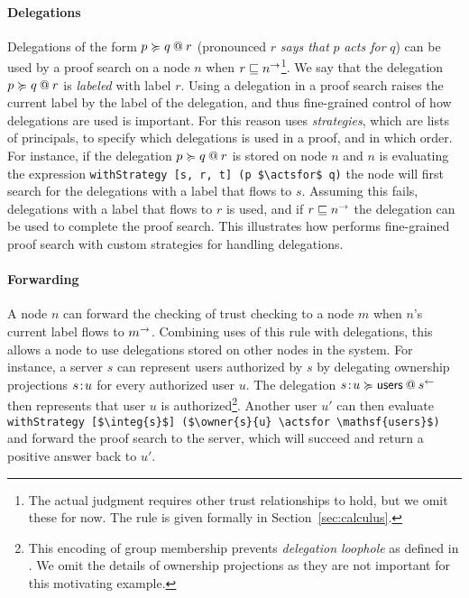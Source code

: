 \paragraph{Delegations}
Delegations of the form $\lb{r}{p \actsfor q}$ (pronounced $r$ \emph{says that} $p$ \emph{acts for} $q$) can be used by a proof search on a node $n$ when $r \flowsto \conf{n}$\footnote{The actual judgment requires other trust relationships to hold, but we omit these for now. The rule is given formally in Section~\ref{sec:calculus}.}. We say that the delegation $\lb{r}{p \actsfor q}$ is \emph{labeled} with label $r$. Using a delegation in a proof search raises the current label by the label of the delegation, and thus fine-grained control of how delegations are used is important. For this reason \lang{} uses \emph{strategies}, which are lists of principals, to specify which delegations is used in a proof, and in which order. For instance, if the delegation $\lb{r}{p \actsfor q}$ is stored on node $n$ and $n$ is evaluating the expression \lstinline[mathescape]!withStrategy [s, r, t] (p $\actsfor$ q)! the node will first search for the delegations with a label that flows to $s$. Assuming this fails, delegations with a label that flows to $r$ is used, and if $r \flowsto \conf{n}$ the delegation can be used to complete the proof search. This illustrates how \lang{} performs fine-grained proof search with custom strategies for handling delegations.

\paragraph{Forwarding}
A node $n$ can forward the checking of trust checking to a node $m$ when $n$'s current label flows to $\conf{m}$. Combining uses of this rule with delegations, this allows a node to use delegations stored on other nodes in the system. For instance, a server $s$ can represent users authorized by $s$ by delegating ownership projections $\owner{s}{u}$ for every authorized user $u$. The delegation $\lb{\integ{s}}{\owner{s}{u} \actsfor \mathsf{users}}$ then represents that user $u$ is authorized\footnote{This encoding of group membership prevents \emph{delegation loophole} as defined in \cite{Arden:2015:FA:2859845.2859998}. We omit the details of ownership projections as they are not important for this motivating example.}. Another user $u'$ can then evaluate \lstinline[mathescape]!withStrategy [$\integ{s}$] ($\owner{s}{u} \actsfor \mathsf{users}$)! and forward the proof search to the server, which will succeed and return a positive answer back to $u'$.